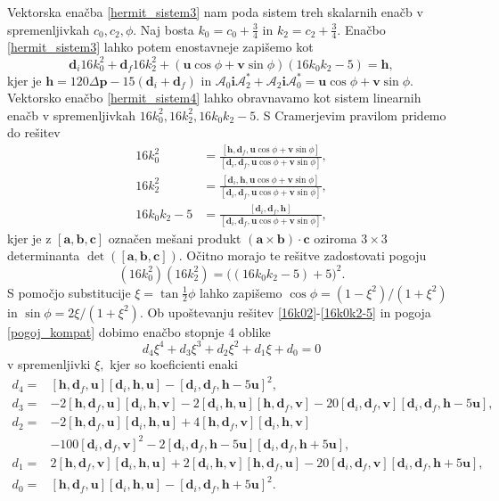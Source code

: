 \documentclass[12pt,a4paper,twoside]{article}
\theoremstyle{definition} %
\theoremstyle{plain} %
\theoremstyle{primerstyle}
\numberwithin{equation}{section}  %
\newcommand{\aV}{\mathbf{a}}
\newcommand{\bV}{\mathbf{b}}
\newcommand{\cV}{\mathbf{c}}
\newcommand{\dV}{\mathbf{d}}
\newcommand{\hV}{\mathbf{h}}
\newcommand{\pV}{\mathbf{p}}
\newcommand{\iV}{\mathbf{i}}
\newcommand{\uV}{\mathbf{u}}
\newcommand{\vV}{\mathbf{v}}
\newcommand{\AQ}{\mathcal{A}}
\begin{document}
Vektorska enačba \eqref{hermit_sistem3} nam poda sistem treh skalarnih enačb v spremenljivkah $c_0,c_2,\phi.$ Naj bosta $k_0=c_0+\frac{3}{4}$ in $k_2=c_2+\frac{3}{4}.$ Enačbo \eqref{hermit_sistem3} lahko potem enostavneje zapišemo kot
\begin{equation}
	\label{hermit_sistem4}
	\dV_i16k_0^2+\dV_f16k_2^2+(\uV\cos\phi+\vV\sin\phi)(16k_0k_2-5)=\hV,
\end{equation}
kjer je $\hV=120\Delta\pV-15(\dV_i+\dV_f)$ in $\AQ_0\iV\AQ_2^*+\AQ_2\iV\AQ_0^*=\uV\cos\phi+\vV\sin\phi.$ Vektorsko enačbo \eqref{hermit_sistem4} lahko obravnavamo kot sistem linearnih enačb v spremenljivkah $16k_0^2,16k_2^2,16k_0k_2-5.$ S Cramerjevim pravilom pridemo do rešitev
\begin{align}
	16k_0^2&=\frac{[\hV,\dV_f,\uV\cos\phi+\vV\sin\phi]}{[\dV_i,\dV_f,\uV\cos\phi+\vV\sin\phi]},\label{16k02}\\
	16k_2^2&=\frac{[\dV_i,\hV,\uV\cos\phi+\vV\sin\phi]}{[\dV_i,\dV_f,\uV\cos\phi+\vV\sin\phi]},\label{16k22}\\
	16k_0k_2-5&=\frac{[\dV_i,\dV_f,\hV]}{[\dV_i,\dV_f,\uV\cos\phi+\vV\sin\phi]}\label{16k0k2-5},
\end{align}
kjer je z $[\aV,\bV,\cV]$ označen mešani produkt $(\aV\times\bV)\cdot\cV$ oziroma $3\times3$ determinanta $\det([\aV,\bV,\cV]).$ Očitno morajo te rešitve zadostovati pogoju
\begin{equation}
	\label{pogoj_kompat}
	(16k_0^2)(16k_2^2)=\big((16k_0k_2-5)+5\big)^2.
\end{equation}
S pomočjo substitucije $\xi=\tan\frac{1}{2}\phi$ lahko zapišemo $\cos\phi=(1-\xi^2)/(1+\xi^2)$ in $\sin\phi=2\xi/(1+\xi^2).$ Ob upoštevanju rešitev \eqref{16k02}-\eqref{16k0k2-5} in pogoja \eqref{pogoj_kompat} dobimo enačbo stopnje 4 oblike
\begin{equation}
	\label{enacba_stopnja4}
	d_4\xi^4+d_3\xi^3+d_2\xi^2+d_1\xi+d_0=0
\end{equation}
v spremenljivki $\xi,$ kjer so koeficienti enaki
\begin{align}
	\label{d_koeficienti}
	d_4=&[\hV,\dV_f,\uV][\dV_i,\hV,\uV]-[\dV_i,\dV_f,\hV-5\uV]^2,\nonumber\\
	d_3=&-2[\hV,\dV_f,\uV][\dV_i,\hV,\vV]-2[\dV_i,\hV,\uV][\hV,\dV_f,\vV]-20[\dV_i,\dV_f,\vV][\dV_i,\dV_f,\hV-5\uV],\nonumber\\
	d_2=&-2[\hV,\dV_f,\uV][\dV_i,\hV,\uV]+4[\hV,\dV_f,\vV][\dV_i,\hV,\vV]\nonumber\\
	&-100[\dV_i,\dV_f,\vV]^2-2[\dV_i,\dV_f,\hV-5\uV][\dV_i,\dV_f,\hV+5\uV],\\
	d_1=&2[\hV,\dV_f,\vV][\dV_i,\hV,\uV]+2[\dV_i,\hV,\vV][\hV,\dV_f,\uV]-20[\dV_i,\dV_f,\vV][\dV_i,\dV_f,\hV+5\uV],\nonumber\\
	d_0=&[\hV,\dV_f,\uV][\dV_i,\hV,\uV]-[\dV_i,\dV_f,\hV+5\uV]^2.\nonumber
\end{align}
\end{document}
